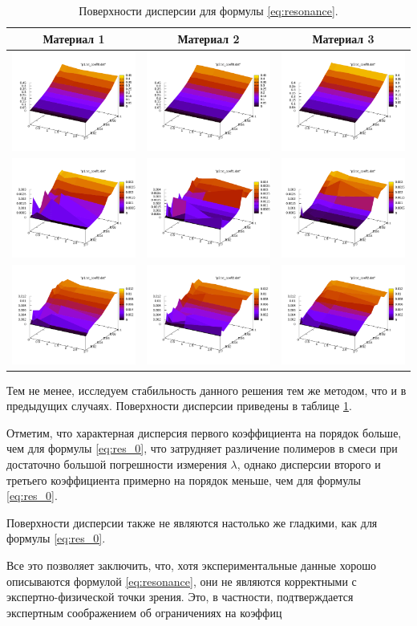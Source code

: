 \documentclass[12pt,a4paper]{article}
\theoremstyle{definition}
\begin{document}
\begin{table}[h]
  \centering
  \begin{tabular}{c c c}
	Материал 1 & Материал 2 & Материал 3 \\ \hline
	\includegraphics[scale=0.25]{figs/resonance/p1.txt_coeff0.dat.pdf} & \includegraphics[scale=0.25]{figs/resonance/p2.txt_coeff0.dat.pdf} & \includegraphics[scale=0.25]{figs/resonance/p3.txt_coeff0.dat.pdf} \\
	\includegraphics[scale=0.25]{figs/resonance/p1.txt_coeff1.dat.pdf} & \includegraphics[scale=0.25]{figs/resonance/p2.txt_coeff1.dat.pdf} & \includegraphics[scale=0.25]{figs/resonance/p3.txt_coeff1.dat.pdf} \\
	\includegraphics[scale=0.25]{figs/resonance/p1.txt_coeff2.dat.pdf} & \includegraphics[scale=0.25]{figs/resonance/p2.txt_coeff2.dat.pdf} & \includegraphics[scale=0.25]{figs/resonance/p3.txt_coeff2.dat.pdf}
  \end{tabular}
  \caption{Поверхности дисперсии для формулы \eqref{eq:resonance}.}
  \label{tabl:res_resonance}
\end{table}

Тем не менее, исследуем стабильность данного решения тем же методом, что и в
предыдущих случаях. Поверхности дисперсии приведены в таблице \ref{tabl:res_resonance}.

Отметим, что характерная дисперсия первого коэффициента на порядок больше, чем
для формулы \eqref{eq:res_0}, что затрудняет различение полимеров в смеси при
достаточно большой погрешности измерения $\lambda$, однако дисперсии второго и
третьего коэффициента примерно на порядок меньше, чем для формулы
\eqref{eq:res_0}.

Поверхности дисперсии также не являются настолько же гладкими, как для формулы
\eqref{eq:res_0}.

Все это позволяет заключить, что, хотя экспериментальные данные хорошо
описываются формулой \eqref{eq:resonance}, они не являются корректными с
экспертно-физической точки зрения. Это, в частности, подтверждается экспертным
соображением об ограничениях на коэффиц
\end{document}
